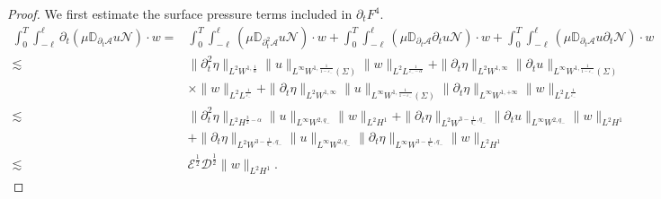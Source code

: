 \documentclass[10pt,a4paper]{amsart}
\def\p{\partial}
\begin{document}
\begin{proof}
			We first estimate the surface pressure terms included in $\p_{t}F^{4}$.
			\[
			\begin{aligned}
				\int_{0}^{T}\int_{-\ell}^{\ell}\p_{t}(\mu \mathbb{D}_{\p_{t}\mathcal{A}}u\mathcal{N})\cdot w=& \int_{0}^{T}\int_{-\ell}^{\ell}(\mu \mathbb{D}_{\p_{t}^{2}\mathcal{A}}u\mathcal{N})\cdot w+ \int_{0}^{T}\int_{-\ell}^{\ell}(\mu \mathbb{D}_{\p_{t}\mathcal{A}}\p_{t}u\mathcal{N})\cdot w+ \int_{0}^{T}\int_{-\ell}^{\ell}(\mu \mathbb{D}_{\p_{t}\mathcal{A}}u\p_{t}\mathcal{N})\cdot w\\
				\lesssim& \|\p_{t}^{2}\eta\|_{L^{2}W^{1,\frac{1}{\alpha}}}\|u\|_{L^{\infty}W^{1,\frac{1}{1-\varepsilon_{-}}}(\Sigma)}\| w\|_{L^{2}L^{\frac{1}{\varepsilon_{-}-\alpha}}}+\|\p_{t}\eta\|_{L^{2}W^{1,\infty}}\|\p_{t}u\|_{L^{\infty}W^{1,\frac{1}{1-\varepsilon_{-}}}(\Sigma)}\\
				&\times\| w\|_{L^{2}L^{\frac{1}{\varepsilon_{-}}}}+\|\p_{t}\eta\|_{L^{2}W^{1,\infty}}\|u\|_{L^{\infty}W^{1,\frac{1}{1-\varepsilon_{-}}}(\Sigma)}\|\p_{t}\eta\|_{L^{\infty}W^{1,+\infty}}\| w\|_{L^{2}L^{\frac{1}{\varepsilon_{-}}}}\\
				\lesssim& \|\p_{t}^{2}\eta\|_{L^{2}H^{\frac{3}{2}-\alpha}}\|u\|_{L^{\infty}W^{2,q_{-}}}\| w\|_{L^{2}H^{1}}+\|\p_{t}\eta\|_{L^{2}W^{3-\frac{1}{q_{-}},q_{-}}}\|\p_{t}u\|_{L^{\infty}W^{2,q_{-}}}\| w\|_{L^{2}H^{1}}\\
				&+\|\p_{t}\eta\|_{L^{2}W^{3-\frac{1}{q_{-}},q_{-}}}\|u\|_{L^{\infty}W^{2,q_{-}}}\|\p_{t}\eta\|_{L^{\infty}W^{3-\frac{1}{q_{-}},q_{-}}}\| w\|_{L^{2}H^{1}}\\
				\lesssim&\mathscr{E}^{\frac{1}{2}}\mathscr{D}^{\frac{1}{2}}\|w\|_{L^{2}H^{1}}.
			\end{aligned}
			\]
			

\end{proof}
\end{document}
